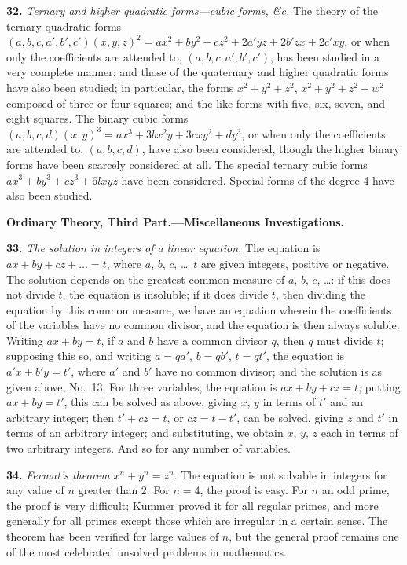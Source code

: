 \documentclass[11pt,a4paper]{article}
\begin{document}
\textbf{32.}\quad
\textit{Ternary and higher quadratic forms---cubic forms, \&c.} The theory of the ternary quadratic forms $(a, b, c, a', b', c')(x, y, z)^{2} = ax^{2} + by^{2} + cz^{2} + 2a'yz + 2b'zx + 2c'xy$, or when only the coefficients are attended to, $(a, b, c, a', b', c')$, has been studied in a very complete manner: and those of the quaternary and higher quadratic forms have also been studied; in particular, the forms $x^{2} + y^{2} + z^{2}$, $x^{2} + y^{2} + z^{2} + w^{2}$ composed of three or four squares; and the like forms with five, six, seven, and eight squares. The binary cubic forms $(a, b, c, d)(x, y)^{3} = ax^{3} + 3bx^{2}y + 3cxy^{2} + dy^{3}$, or when only the coefficients are attended to, $(a, b, c, d)$, have also been considered, though the higher binary forms have been scarcely considered at all. The special ternary cubic forms $ax^{3} + by^{3} + cz^{3} + 6lxyz$ have been considered. Special forms of the degree 4 have also been studied.

\bigskip
\noindent\textbf{Ordinary Theory, Third Part.---Miscellaneous Investigations.}

\smallskip

\textbf{33.}\quad
\textit{The solution in integers of a linear equation.} The equation is $ax + by + cz + \ldots = t$, where $a$, $b$, $c$, \ldots\ $t$ are given integers, positive or negative. The solution depends on the greatest common measure of $a$, $b$, $c$, \ldots: if this does not divide $t$, the equation is insoluble; if it does divide $t$, then dividing the equation by this common measure, we have an equation wherein the coefficients of the variables have no common divisor, and the equation is then always soluble. Writing $ax + by = t$, if $a$ and $b$ have a common divisor $q$, then $q$ must divide $t$; supposing this so, and writing $a = qa'$, $b = qb'$, $t = qt'$, the equation is $a'x + b'y = t'$, where $a'$ and $b'$ have no common divisor; and the solution is as given above, No.~13. For three variables, the equation is $ax + by + cz = t$; putting $ax + by = t'$, this can be solved as above, giving $x$, $y$ in terms of $t'$ and an arbitrary integer; then $t' + cz = t$, or $cz = t - t'$, can be solved, giving $z$ and $t'$ in terms of an arbitrary integer; and substituting, we obtain $x$, $y$, $z$ each in terms of two arbitrary integers. And so for any number of variables.

\textbf{34.}\quad
\textit{Fermat's theorem} $x^{n} + y^{n} = z^{n}$. The equation is not solvable in integers for any value of $n$ greater than 2. For $n = 4$, the proof is easy. For $n$ an odd prime, the proof is very difficult; Kummer proved it for all regular primes, and more generally for all primes except those which are irregular in a certain sense. The theorem has been verified for large values of $n$, but the general proof remains one of the most celebrated unsolved problems in mathematics.
\end{document}
